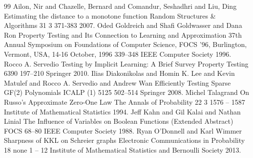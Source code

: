 \documentclass[10pt,a4paper]{article}
\theoremstyle{plain}
\theoremstyle{remark}
\theoremstyle{plain}
\begin{document}
\begin{thebibliography}{99}
 Ailon, Nir and Chazelle, Bernard and Comandur, Seshadhri and Liu, Ding Estimating the distance to a monotone function Random Structures \& Algorithms 31 3 371-383 2007.
 Oded Goldreich and Shafi Goldwasser and Dana Ron Property Testing and Its Connection to Learning and Approximation 37th Annual Symposium on Foundations of Computer Science, {FOCS} '96, Burlington, Vermont, USA, 14-16 October, 1996 339--348 {IEEE} Computer Society 1996.
 Rocco A. Servedio Testing by Implicit Learning: {A} Brief Survey Property Testing 6390 197--210 Springer 2010.
 Ilias Diakonikolas and Homin K. Lee and Kevin Matulef and Rocco A. Servedio and Andrew Wan Efficiently Testing Sparse {GF(2)} Polynomials {ICALP} {(1)} 5125 502--514 Springer 2008.
 Michel Talagrand {On Russo's Approximate Zero-One Law} The Annals of Probability 22 3 1576 -- 1587 Institute of Mathematical Statistics 1994.
 Jeff Kahn and Gil Kalai and Nathan Linial The Influence of Variables on Boolean Functions (Extended Abstract) {FOCS} 68--80 {IEEE} Computer Society 1988.
 Ryan O'Donnell and Karl Wimmer {Sharpness of KKL on Schreier graphs} Electronic Communications in Probability 18 none 1 -- 12 Institute of Mathematical Statistics and Bernoulli Society 2013.
\end{thebibliography}
\end{document}
